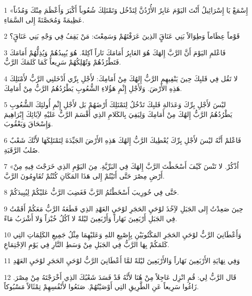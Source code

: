 \par 1 «إِسْمَعْ يَا إِسْرَائِيلُ أَنْتَ اليَوْمَ عَابِرٌ الأُرْدُنَّ لِتَدْخُل وَتَمْتَلِكَ شُعُوباً أَكْبَرَ وَأَعْظَمَ مِنْكَ وَمُدُناً عَظِيمَةً وَمُحَصَّنَةً إِلى السَّمَاءِ.
\par 2 قَوْماً عِظَاماً وَطِوَالاً بَنِي عَنَاقٍَ الذِينَ عَرَفْتَهُمْ وَسَمِعْتَ: مَنْ يَقِفُ فِي وَجْهِ بَنِي عَنَاقٍَ؟
\par 3 فَاعْلمِ اليَوْمَ أَنَّ الرَّبَّ إِلهَكَ هُوَ العَابِرُ أَمَامَكَ نَاراً آكِلةً. هُوَ يُبِيدُهُمْ وَيُذِلُّهُمْ أَمَامَكَ فَتَطْرُدُهُمْ وَتُهْلِكُهُمْ سَرِيعاً كَمَا كَلمَكَ الرَّبُّ.
\par 4 لا تَقُل فِي قَلبِكَ حِينَ يَنْفِيهِمِ الرَّبُّ إِلهُكَ مِنْ أَمَامِكَ: لأَجْلِ بِرِّي أَدْخَلنِي الرَّبُّ لأَمْتَلِكَ هَذِهِ الأَرْضَ. وَلأَجْلِ إِثْمِ هَؤُلاءِ الشُّعُوبِ يَطْرُدُهُمُ الرَّبُّ مِنْ أَمَامِكَ.
\par 5 ليْسَ لأَجْلِ بِرِّكَ وَعَدَالةِ قَلبِكَ تَدْخُلُ لِتَمْتَلِكَ أَرْضَهُمْ بَل لأَجْلِ إِثْمِ أُولئِكَ الشُّعُوبِ يَطْرُدُهُمُ الرَّبُّ إِلهُكَ مِنْ أَمَامِكَ وَلِيَفِيَ بِالكَلامِ الذِي أَقْسَمَ الرَّبُّ عَليْهِ لآِبَائِكَ إِبْرَاهِيمَ وَإِسْحَاقَ وَيَعْقُوبَ.
\par 6 فَاعْلمْ أَنَّهُ ليْسَ لأَجْلِ بِرِّكَ يُعْطِيكَ الرَّبُّ إِلهُكَ هَذِهِ الأَرْضَ الجَيِّدَةَ لِتَمْتَلِكَهَا لأَنَّكَ شَعْبٌ صُلبُ الرَّقَبَةِ.
\par 7 «اُذْكُرْ. لا تَنْسَ كَيْفَ أَسْخَطْتَ الرَّبَّ إِلهَكَ فِي البَرِّيَّةِ. مِنَ اليَوْمِ الذِي خَرَجْتَ فِيهِ مِنْ أَرْضِ مِصْرَ حَتَّى أَتَيْتُمْ إِلى هَذَا المَكَانِ كُنْتُمْ تُقَاوِمُونَ الرَّبَّ.
\par 8 حَتَّى فِي حُورِيبَ أَسْخَطْتُمُ الرَّبَّ فَغَضِبَ الرَّبُّ عَليْكُمْ لِيُبِيدَكُمْ.
\par 9 حِينَ صَعِدْتُ إِلى الجَبَلِ لآِخُذَ لوْحَيِ الحَجَرِ لوْحَيِ العَهْدِ الذِي قَطَعَهُ الرَّبُّ مَعَكُمْ أَقَمْتُ فِي الجَبَلِ أَرْبَعِينَ نَهَاراً وَأَرْبَعِينَ ليْلةً لا آكُلُ خُبْزاً وَلا أَشْرَبُ مَاءً.
\par 10 وَأَعْطَانِيَ الرَّبُّ لوْحَيِ الحَجَرِ المَكْتُوبَيْنِ بِإِصْبِعِ اللهِ وَعَليْهِمَا مِثْلُ جَمِيعِ الكَلِمَاتِ التِي كَلمَكُمْ بِهَا الرَّبُّ فِي الجَبَلِ مِنْ وَسَطِ النَّارِ فِي يَوْمِ الاِجْتِمَاعِ.
\par 11 وَفِي نِهَايَةِ الأَرْبَعِينَ نَهَاراً وَالأَرْبَعِينَ ليْلةً لمَّا أَعْطَانِيَ الرَّبُّ لوْحَيِ الحَجَرِ لوْحَيِ العَهْدِ
\par 12 قَال الرَّبُّ لِي: قُمِ انْزِل عَاجِلاً مِنْ هُنَا لأَنَّهُ قَدْ فَسَدَ شَعْبُكَ الذِي أَخْرَجْتَهُ مِنْ مِصْرَ. زَاغُوا سَرِيعاً عَنِ الطَّرِيقِ التِي أَوْصَيْتُهُمْ. صَنَعُوا لأَنْفُسِهِمْ تِمْثَالاً مَسْبُوكاً.
